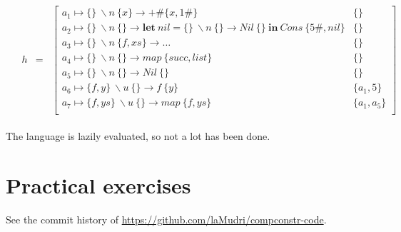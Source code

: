 \documentclass{article}
\begin{document}
\begin{enumerate}
\begin{enumerate}
\begin{align*}
\begin{array}{llcl}
            \\
            & h & = &
              \left[ \begin{array}{ll}
                a_1 \mapsto \{\}~\backslash n~\{x\} \to +\#\{x, 1\#\} & \{\} \\
                a_2 \mapsto \{\}~\backslash n~\{\} \to \mathbf{let}~\mathit{nil} = \{\}~\backslash n~\{\} \to \mathit{Nil}~\{\}~\mathbf{in}~\mathit{Cons}~\{5\#, \mathit{nil}\} & \{\} \\
                a_3 \mapsto \{\}~\backslash n~\{f,xs\} \to \ldots & \{\} \\
                a_4 \mapsto \{\}~\backslash n~\{\} \to \mathit{map}~\{\mathit{succ}, \mathit{list}\} & \{\} \\
                a_5 \mapsto \{\}~\backslash n~\{\} \to \mathit{Nil}~\{\} & \{\} \\
                a_6 \mapsto \{f,y\}~\backslash u~\{\} \to f~\{y\} & \{a_1,5\} \\
                a_7 \mapsto \{f,ys\}~\backslash u~\{\} \to \mathit{map}~\{f,ys\} & \{a_1,a_5\} \\
              \end{array} \right]
            \end{array}
        \end{align*}

        The language is lazily evaluated, so not a lot has been done.
    \end{enumerate}
\end{enumerate}

\section*{Practical exercises}
See the commit history of \url{https://github.com/laMudri/compconstr-code}.
\end{document}
